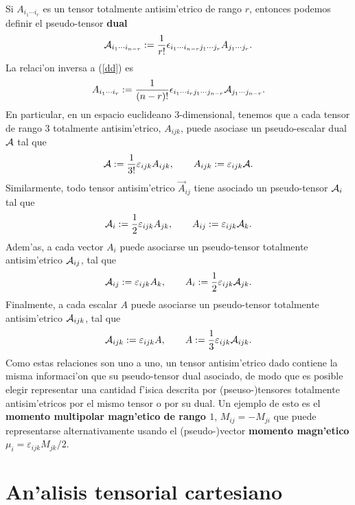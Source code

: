 Si $A_{i_1\cdots i_r}$ es un tensor totalmente antisim'etrico de rango $r$, entonces podemos definir el pseudo-tensor \textbf{dual}
\begin{equation}\label{dd}
{\cal A}_{i_1\cdots i_{n-r}}:=\frac{1}{r!}\epsilon_{i_1\cdots i_{n-r}j_1\cdots j_r}A_{j_1\cdots j_r}.
\end{equation}
La relaci'on inversa a (\ref{dd}) es
\begin{equation}\label{id}
A_{i_1\cdots i_r}:=\frac{1}{(n-r)!}\epsilon_{i_1\cdots i_rj_1\cdots j_{n-r}}{\cal A}_{j_1\cdots j_{n-r}}.
\end{equation}
En particular, en un espacio euclideano 3-dimensional, tenemos que a cada tensor de rango 3 totalmente antisim'etrico, $A_{ijk}$, puede asociase un pseudo-escalar dual ${\cal A}$ tal que
\begin{equation}
{\cal A}:=\frac{1}{3!}\varepsilon_{ijk}A_{ijk}, \qquad A_{ijk}:=\varepsilon_{ijk}{\cal A}.
\end{equation}
Similarmente, todo tensor antisim'etrico $\vec{A}_{ij}$ tiene asociado un pseudo-tensor ${\cal A}_i$ tal que
\begin{equation}
{\cal A}_i:=\frac{1}{2}\varepsilon_{ijk}A_{jk}, \qquad A_{ij}:=\varepsilon_{ijk}{\cal A}_k.
\end{equation}
Adem'as, a cada vector $A_i$ puede asociarse un pseudo-tensor totalmente antisim'etrico ${\cal A}_{ij}$, tal que
\begin{equation}
{\cal A}_{ij}:=\varepsilon_{ijk}A_{k}, \qquad A_i:=\frac{1}{2}\varepsilon_{ijk}{\cal A}_{jk}.
\end{equation}
Finalmente, a cada escalar $A$ puede asociarse un pseudo-tensor totalmente antisim'etrico ${\cal A}_{ijk}$, tal que
\begin{equation}
{\cal A}_{ijk}:=\varepsilon_{ijk}A, \qquad A:=\frac{1}{3}\varepsilon_{ijk}{\cal A}_{ijk}.
\end{equation}
Como estas relaciones son uno a uno, un tensor antisim'etrico dado contiene la misma informaci'on que su pseudo-tensor dual asociado, de modo que es posible elegir representar una cantidad f'isica descrita por (pseuso-)tensores totalmente antisim'etricos por el mismo tensor o por su dual. Un ejemplo de esto es el \textbf{momento multipolar magn'etico de rango $1$}, $M_{ij}=-M_{ji}$ que puede representarse alternativamente usando el (pseudo-)vector \textbf{momento magn'etico} $\mu_i=\varepsilon_{ijk}M_{jk}/2$.

\section{An'alisis tensorial cartesiano}
